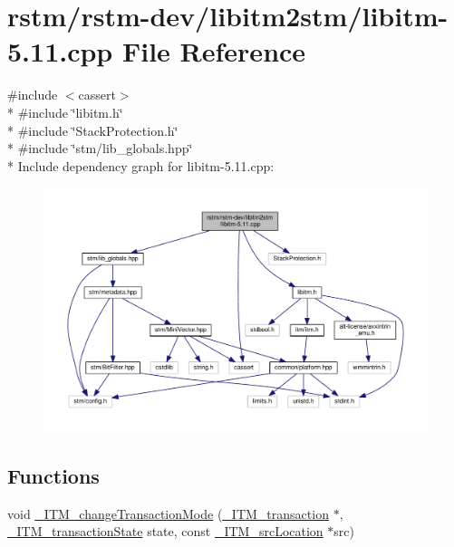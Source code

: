 \hypertarget{libitm-5_811_8cpp}{\section{rstm/rstm-\/dev/libitm2stm/libitm-\/5.11.cpp File Reference}
\label{libitm-5_811_8cpp}
}
{\ttfamily \#include $<$cassert$>$}\\*
{\ttfamily \#include \char`\"{}libitm.\-h\char`\"{}}\\*
{\ttfamily \#include \char`\"{}Stack\-Protection.\-h\char`\"{}}\\*
{\ttfamily \#include \char`\"{}stm/lib\-\_\-globals.\-hpp\char`\"{}}\\*
Include dependency graph for libitm-\/5.11.cpp\-:
\nopagebreak
\begin{figure}[H]
\begin{center}
\leavevmode
\includegraphics[width=350pt]{libitm-5_811_8cpp__incl}
\end{center}
\end{figure}
\subsection*{Functions}
\begin{DoxyCompactItemize}
\item 
void \hyperlink{libitm-5_811_8cpp_ad5f06202e36d859cc49bb4aa01d709ab}{\-\_\-\-I\-T\-M\-\_\-change\-Transaction\-Mode} (\hyperlink{libitm_8h_a65d3a93d285fdbde408558d6b431abc8}{\-\_\-\-I\-T\-M\-\_\-transaction} $\ast$, \hyperlink{libitm_8h_a1e070460d135ffad19d298e5dbd01a71}{\-\_\-\-I\-T\-M\-\_\-transaction\-State} state, const \hyperlink{struct__ITM__srcLocation}{\-\_\-\-I\-T\-M\-\_\-src\-Location} $\ast$src)
\end{DoxyCompactItemize}


